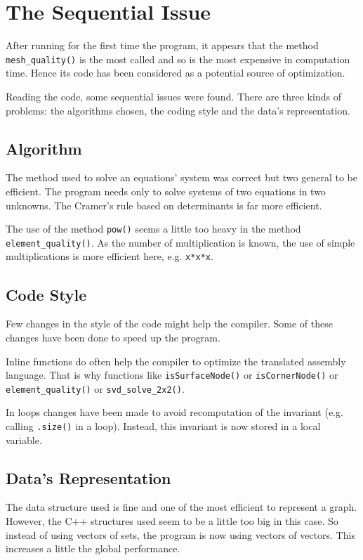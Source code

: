 \documentclass[fleqn,11pt]{SelfArx} %
\begin{document}
\section{The Sequential Issue}

After running for the first time the program, it appears that the method \verb+mesh_quality()+ is the most called and so is the most expensive in computation time. Hence its code has been considered as a potential source of optimization.

Reading the code, some sequential issues were found. There are three kinds of problems: the algorithms chosen, the coding style and the data's representation.

\subsection{Algorithm}

The method used to solve an equations' system was correct but two general to be efficient. The program needs only to solve systems of two equations in two unknowns. The Cramer's rule based on determinants is far more efficient.

The use of the method \verb+pow()+ seems a little too heavy in the method \verb+element_quality()+. As the number of multiplication is known, the use of simple multiplications is more efficient here, e.g. \verb+x*x*x+.

\subsection{Code Style}

Few changes in the style of the code might help the compiler. Some of these changes have been done to speed up the program.

Inline functions do often help the compiler to optimize the translated assembly language. That is why functions like \verb+isSurfaceNode()+ or \verb+isCornerNode()+ or \verb+element_quality()+ or \verb+svd_solve_2x2()+.

In loops changes have been made to avoid recomputation of the invariant (e.g. calling \verb+.size()+ in a loop). Instead, this invariant is now stored in a local variable.

\subsection{Data's Representation}

The data structure used is fine and one of the most efficient to represent a graph. However, the C++ structures used seem to be a little too big in this case. So instead of using vectors of sets, the program is now using vectors of vectors. This increases a little the global performance.
\end{document}
